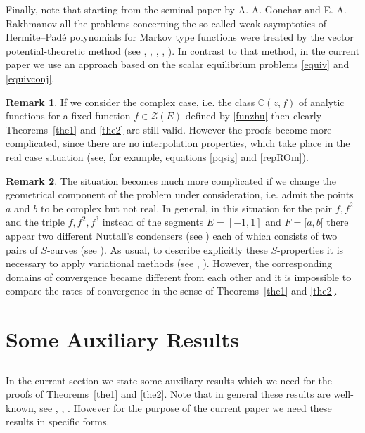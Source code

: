 \documentclass[11pt, a4paper, twoside]{article}
\def\CC{\mathbb C}
\theoremstyle{plain}
\theoremstyle{definition}
\newtheorem{remark}{Remark}
\begin{document}
Finally, note that starting from the seminal paper by A. A. Gonchar and E. A. Rakhmanov \cite{GoRa81} all the problems concerning the so-called weak asymptotics of Hermite--Padé polynomials for Markov type functions were treated by the vector potential-theoretic method (see \cite{GoRaSo97}, \cite{ApLy10}, \cite{Lys20}, \cite{ApLy21}, \cite{Lys24}).  In contrast to that method, in the current paper we use an approach based on the scalar equilibrium problems \eqref{equiv} and \eqref{equivconj}.

\begin{remark}\label{rem11}
If we consider the complex case, i.e. the class $\CC(z,f)$  of analytic functions for a fixed function $f\in\mathscr Z(E)$ defined  by \eqref{funzhu} then  clearly Theorems~\ref{the1} and \ref{the2} are still valid. However the proofs become more complicated, since there are no interpolation properties, which take place in the real case situation (see, for example, equations \eqref{pqsig} and \eqref{repROm}).
\end{remark}

\begin{remark}\label{rem12}
The situation becomes much more complicated  if we change the geometrical  component of the problem under consideration, i.e. admit the points $a$ and $b$ to be complex but not real. In  general, in this situation for the pair $f,f^2$ and the triple $f,f^2,f^3$ instead of the segments $E=[-1,1]$ and $F=[a,b[$ there appear two different Nuttall's condensers (see \cite{RaSu13}) each of which consists of two  pairs of $S$-curves (see \cite{Rak12}).  As usual, to describe explicitly these $S$-properties it is necessary to apply variational methods (see \cite{Rak12}, \cite{Dub24}). However, the corresponding domains of convergence became different from each other and it is impossible to compare the rates of convergence in the sense of Theorems~\ref{the1} and \ref{the2}.
\end{remark}


\section{Some Auxiliary Results}\label{s2}

\subsection{}\label{s2s1}
In the current section we state some auxiliary results which we need for the proofs of Theorems~\ref{the1} and  \ref{the2}. Note that in general these results are well-known, see \cite{GoRa87}, \cite{BuSu15}, \cite{Rak16}. However for the purpose of the current paper we need these results in specific forms.
\end{document}
